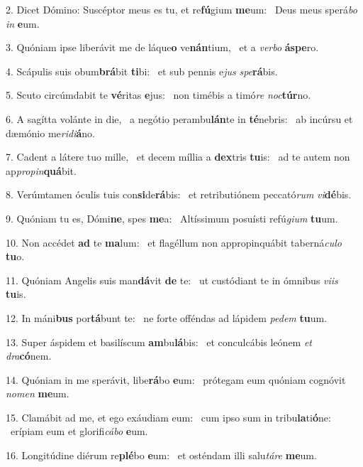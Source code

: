 2. Dicet Dómino: Suscéptor meus es tu, et re\textbf{fú}gium \textbf{me}um: \ast\  Deus meus sperá\textit{bo} \textit{in} \textbf{e}um.\

3. Quóniam ipse liberávit me de láque\textbf{o} ve\textbf{nán}tium, \ast\  et a \textit{ver}\textit{bo} \textbf{ás}\textbf{pe}ro.\

4. Scápulis suis obum\textbf{brá}bit \textbf{ti}bi: \ast\  et sub pennis e\textit{jus} \textit{spe}\textbf{rá}bis.\

5. Scuto circúmdabit te \textbf{vé}ritas \textbf{e}jus: \ast\  non timébis a timó\textit{re} \textit{noc}\textbf{túr}no.\

6. A sagítta volánte in die, \dag\  a negótio perambu\textbf{lán}te in \textbf{té}nebris: \ast\  ab incúrsu et dæmónio me\textit{ri}\textit{di}\textbf{á}no.\

7. Cadent a látere tuo mille, \dag\  et decem míllia a \textbf{dex}tris \textbf{tu}is: \ast\  ad te autem non ap\textit{pro}\textit{pin}\textbf{quá}bit.\

8. Verúmtamen óculis tuis con\textbf{si}de\textbf{rá}bis: \ast\  et retributiónem peccató\textit{rum} \textit{vi}\textbf{dé}bis.\

9. Quóniam tu es, Dómi\textbf{ne}, spes \textbf{me}a: \ast\  Altíssimum posuísti refú\textit{gi}\textit{um} \textbf{tu}um.\

10. Non accédet \textbf{ad} te \textbf{ma}lum: \ast\  et flagéllum non appropinquábit taberná\textit{cu}\textit{lo} \textbf{tu}o.\

11. Quóniam Angelis suis man\textbf{dá}vit \textbf{de} te: \ast\  ut custódiant te in ómnibus \textit{vi}\textit{is} \textbf{tu}is.\

12. In máni\textbf{bus} por\textbf{tá}bunt te: \ast\  ne forte offéndas ad lápidem \textit{pe}\textit{dem} \textbf{tu}um.\

13. Super áspidem et basilíscum \textbf{am}bu\textbf{lá}bis: \ast\  et conculcábis leónem \textit{et} \textit{dra}\textbf{có}nem.\

14. Quóniam in me sperávit, libe\textbf{rá}bo \textbf{e}um: \ast\  prótegam eum quóniam cognóvit \textit{no}\textit{men} \textbf{me}um.\

15. Clamábit ad me, et ego exáudiam eum: \dag\  cum ipso sum in tribu\textbf{la}ti\textbf{ó}ne: \ast\  erípiam eum et glorifi\textit{cá}\textit{bo} \textbf{e}um.\

16. Longitúdine diérum re\textbf{plé}bo \textbf{e}um: \ast\  et osténdam illi salu\textit{tá}\textit{re} \textbf{me}um.\

